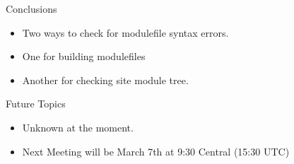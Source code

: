 \documentclass{beamer}
\begin{document}
\begin{frame}{Conclusions}
  \begin{itemize}
    \item Two ways to check for modulefile syntax errors.
    \item One for building modulefiles
    \item Another for checking site module tree.
  \end{itemize}
\end{frame}

\begin{frame}{Future Topics}
  \begin{itemize}
    \item Unknown at the moment.
    \item Next Meeting will be March 7th at 9:30 Central (15:30 UTC)
  \end{itemize}
\end{frame}
\end{document}
